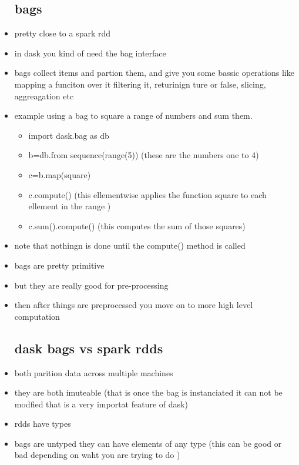 \documentclass{article}
\begin{document}
\begin{itemize}
\subsection{bags}
\item pretty close to a spark rdd
\item in dask you kind of need the bag interface
\item bags collect items and partion them, and give you some bassic operations like mapping a funciton over it filtering it, returinign ture or false, slicing, aggreagation etc 
\item example using a bag to square a range of numbers and sum them.
\begin{itemize}
    \item import dask.bag as db 
    \item b=db.from sequence(range(5)) (these are the numbers one to 4)
    \item c=b.map(square)
    \item c.compute()  (this ellementwise applies the function square to each ellement in the range )
    \item c.sum().compute() (this computes the sum of those squares)
\end{itemize}
\item note that nothingn is done until the compute() method is called
\item bags are pretty primitive 
\item but they are really good for pre-processing 
\item then after things are preprocessed you move on to more high level computation
\subsection{dask bags vs spark rdds}
\item both parition data across multiple machines 
\item they are both imuteable (that is once the bag is instanciated it can not be modfied that is a very importat feature of dask)
\item rdds have types 
\item bags are untyped they can have elements of any type (this can be  good or bad depending on waht you are trying to do )

\end{itemize}
\end{document}
